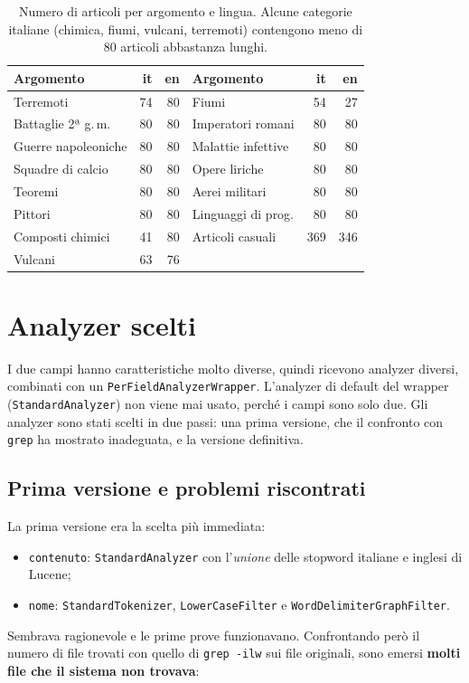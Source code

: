 \documentclass[11pt,a4paper]{article}
\newcommand{\code}[1]{\texttt{#1}}
\newcommand{\field}[1]{\texttt{#1}}
\begin{document}
\begin{table}[!htbp]
\centering
\small
\begin{tabular}{@{}lrrlrr@{}}
\toprule
\textbf{Argomento} & \textbf{it} & \textbf{en} & \textbf{Argomento} & \textbf{it} & \textbf{en} \\
\midrule
Terremoti & 74 & 80 & Fiumi & 54 & 27 \\
Battaglie 2ª g.\,m. & 80 & 80 & Imperatori romani & 80 & 80 \\
Guerre napoleoniche & 80 & 80 & Malattie infettive & 80 & 80 \\
Squadre di calcio & 80 & 80 & Opere liriche & 80 & 80 \\
Teoremi & 80 & 80 & Aerei militari & 80 & 80 \\
Pittori & 80 & 80 & Linguaggi di prog. & 80 & 80 \\
Composti chimici & 41 & 80 & Articoli casuali & 369 & 346 \\
Vulcani & 63 & 76 & & & \\
\bottomrule
\end{tabular}
\caption{Numero di articoli per argomento e lingua. Alcune categorie italiane (chimica,
fiumi, vulcani, terremoti) contengono meno di 80 articoli abbastanza lunghi.}
\label{tab:argomenti}
\end{table}

\section{Analyzer scelti}

I due campi hanno caratteristiche molto diverse, quindi ricevono analyzer diversi,
combinati con un \code{PerFieldAnalyzerWrapper}. L'analyzer di default del wrapper
(\code{StandardAnalyzer}) non viene mai usato, perché i campi sono solo due.
Gli analyzer sono stati scelti in due passi: una prima versione, che il confronto con
\code{grep} ha mostrato inadeguata, e la versione definitiva.

\subsection{Prima versione e problemi riscontrati}
\label{sec:prima}

La prima versione era la scelta più immediata:
\begin{itemize}
  \item \field{contenuto}: \code{StandardAnalyzer} con l'\emph{unione} delle stopword
        italiane e inglesi di Lucene;
  \item \field{nome}: \code{StandardTokenizer}, \code{LowerCaseFilter} e
        \code{WordDelimiterGraphFilter}.
\end{itemize}
Sembrava ragionevole e le prime prove funzionavano. Confrontando però il numero di
file trovati con quello di \code{grep -ilw} sui file originali, sono emersi
\textbf{molti file che il sistema non trovava}:
\end{document}
